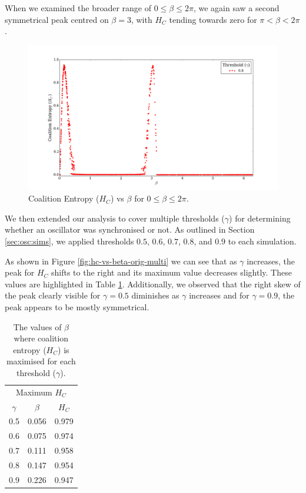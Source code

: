 \documentclass[a4paper,11pt]{article}
\begin{document}
When we examined the broader range of $0 \leq \beta \leq 2\pi$, we again saw a second symmetrical peak centred on $\beta = 3$, with $H_C$ tending towards zero for $\pi < \beta< 2\pi$.

\begin{figure}[H]
\begin{center}
\includegraphics[scale = 0.35]{figures/hc_vs_beta_ext}
\caption{
	Coalition Entropy ($H_C$) vs $\beta$ for $0 \leq \beta \leq 2\pi$.
	\label{fig:hc-vs-beta-ext}
}
\end{center}
\end{figure}

We then extended our analysis to cover multiple thresholds ($\gamma$) for determining whether an oscillator was synchronised or not. As outlined in Section \ref{sec:osc:sims}, we applied thresholds $0.5$, $0.6$, $0.7$, $0.8$, and $0.9$ to each simulation.

As shown in Figure \ref{fig:hc-vs-beta-orig-multi} we can see that as $\gamma$ increases, the peak for $H_C$ shifts to the right and its maximum value decreases slightly. These values are highlighted in Table \ref{tab:max-hc-beta}. Additionally, we observed that the right skew of the peak clearly visible for $\gamma = 0.5$ diminishes as $\gamma$ increases and for $\gamma = 0.9$, the peak appears to be mostly symmetrical.

\begin{table}[ht]
\centering
\begin{tabular}{ c | c c }
\multicolumn{3}{c}{Maximum $H_C$} \\ [2mm]
$\gamma$ & $\beta$ & $H_C$\\
\hline
0.5 & 0.056 & 0.979 \\
0.6 & 0.075 & 0.974 \\
0.7 & 0.111 & 0.958 \\
0.8 & 0.147 & 0.954 \\
0.9 & 0.226 & 0.947 \\
\end{tabular}
\caption{
	The values of $\beta$ where coalition entropy ($H_C$) is maximised for each threshold ($\gamma$).
	\label{tab:max-hc-beta}
}
\end{table}
\end{document}
